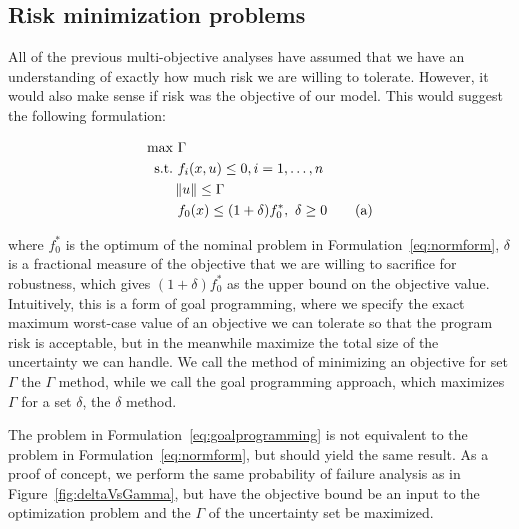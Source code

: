 \subsection{Risk minimization problems}

All of the previous multi-objective analyses have assumed that we have an
understanding of exactly how much risk we are
willing to tolerate. However, it would also make sense if risk was the objective of our
model. This would suggest the following formulation:

\begin{align*}
    \text{max} &~\Gamma \\
    \text{s.t.}     &~f_i(x,u) \leq 0, i = 1,\ldots,n \\
                    & \left\lVert u\right\rVert \leq \Gamma \\
                    &~f_0(x) \leq (1+\delta)f_0^*,~\delta \geq 0 \tag{a}
    \label{eq:goalprogramming}
\end{align*}

where $f_0^*$ is the optimum of the nominal problem in Formulation~\ref{eq:normform}, $\delta$
is a fractional measure of the objective that we are willing to sacrifice for robustness, which
gives $(1+\delta)f_0^*$ as the upper bound on the objective value. Intuitively,
this is a form of goal programming,
where we specify the exact maximum worst-case value of an objective we can tolerate so that the program
risk is acceptable, but in the meanwhile maximize the total size of the uncertainty we can handle.
We call the method of minimizing an objective for set ${\Gamma}$ the $\Gamma$ method,
while we call the goal programming approach, which maximizes $\Gamma$ for a set $\delta$, the $\delta$ method.

The problem in Formulation~\ref{eq:goalprogramming} is not equivalent to the problem in Formulation~\ref{eq:normform},
but should yield the same result. As a proof of concept, we perform the same probability of failure
analysis as in Figure~\ref{fig:deltaVsGamma}, but have the objective bound be an input to the
optimization problem and the $\Gamma$ of the uncertainty set be maximized.

